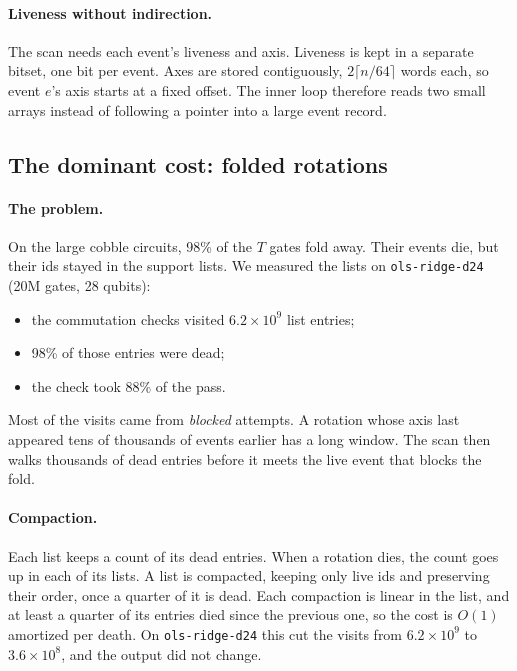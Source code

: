 \documentclass[11pt]{article}
\theoremstyle{definition}
\theoremstyle{remark}
\begin{document}
\paragraph{Liveness without indirection.}
The scan needs each event's liveness and axis. Liveness is kept in a separate bitset, one
bit per event. Axes are stored contiguously, $2\lceil n/64\rceil$ words each, so event
$e$'s axis starts at a fixed offset. The inner loop therefore reads two small arrays
instead of following a pointer into a large event record.

\subsection{The dominant cost: folded rotations}

\paragraph{The problem.}
On the large cobble circuits, 98\% of the $T$ gates fold away. Their events die, but their
ids stayed in the support lists. We measured the lists on \texttt{ols-ridge-d24} (20M gates,
28 qubits):
\begin{itemize}[nosep]
  \item the commutation checks visited $6.2 \times 10^9$ list entries;
  \item 98\% of those entries were dead;
  \item the check took 88\% of the pass.
\end{itemize}
Most of the visits came from \emph{blocked} attempts. A rotation whose axis last appeared
tens of thousands of events earlier has a long window. The scan then walks thousands of
dead entries before it meets the live event that blocks the fold.

\paragraph{Compaction.}
Each list keeps a count of its dead entries. When a rotation dies, the count goes up in
each of its lists. A list is compacted, keeping only live ids and preserving their order,
once a quarter of it is dead. Each compaction is linear in the list, and at least a
quarter of its entries died since the previous one, so the cost is $O(1)$ amortized per
death. On \texttt{ols-ridge-d24} this cut the visits from $6.2 \times 10^9$ to
$3.6 \times 10^8$, and the output did not change.
\end{document}
